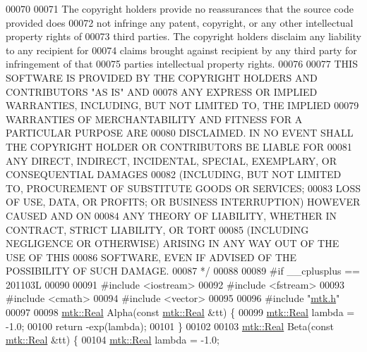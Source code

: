 \begin{DoxyCode}
00070 \textcolor{comment}{}
00071 \textcolor{comment}{The copyright holders provide no reassurances that the source code provided does}
00072 \textcolor{comment}{not infringe any patent, copyright, or any other intellectual property rights of}
00073 \textcolor{comment}{third parties. The copyright holders disclaim any liability to any recipient for}
00074 \textcolor{comment}{claims brought against recipient by any third party for infringement of that}
00075 \textcolor{comment}{parties intellectual property rights.}
00076 \textcolor{comment}{}
00077 \textcolor{comment}{THIS SOFTWARE IS PROVIDED BY THE COPYRIGHT HOLDERS AND CONTRIBUTORS "AS IS" AND}
00078 \textcolor{comment}{ANY EXPRESS OR IMPLIED WARRANTIES, INCLUDING, BUT NOT LIMITED TO, THE IMPLIED}
00079 \textcolor{comment}{WARRANTIES OF MERCHANTABILITY AND FITNESS FOR A PARTICULAR PURPOSE ARE}
00080 \textcolor{comment}{DISCLAIMED. IN NO EVENT SHALL THE COPYRIGHT HOLDER OR CONTRIBUTORS BE LIABLE FOR}
00081 \textcolor{comment}{ANY DIRECT, INDIRECT, INCIDENTAL, SPECIAL, EXEMPLARY, OR CONSEQUENTIAL DAMAGES}
00082 \textcolor{comment}{(INCLUDING, BUT NOT LIMITED TO, PROCUREMENT OF SUBSTITUTE GOODS OR SERVICES;}
00083 \textcolor{comment}{LOSS OF USE, DATA, OR PROFITS; OR BUSINESS INTERRUPTION) HOWEVER CAUSED AND ON}
00084 \textcolor{comment}{ANY THEORY OF LIABILITY, WHETHER IN CONTRACT, STRICT LIABILITY, OR TORT}
00085 \textcolor{comment}{(INCLUDING NEGLIGENCE OR OTHERWISE) ARISING IN ANY WAY OUT OF THE USE OF THIS}
00086 \textcolor{comment}{SOFTWARE, EVEN IF ADVISED OF THE POSSIBILITY OF SUCH DAMAGE.}
00087 \textcolor{comment}{*/}
00088 
00089 \textcolor{preprocessor}{#if \_\_cplusplus == 201103L}
00090 
00091 \textcolor{preprocessor}{#include <iostream>}
00092 \textcolor{preprocessor}{#include <fstream>}
00093 \textcolor{preprocessor}{#include <cmath>}
00094 \textcolor{preprocessor}{#include <vector>}
00095 
00096 \textcolor{preprocessor}{#include "\hyperlink{mtk_8h}{mtk.h}"}
00097 
00098 \hyperlink{group__c01-roots_gac080bbbf5cbb5502c9f00405f894857d}{mtk::Real} Alpha(\textcolor{keyword}{const} \hyperlink{group__c01-roots_gac080bbbf5cbb5502c9f00405f894857d}{mtk::Real} &tt) \{
00099   \hyperlink{group__c01-roots_gac080bbbf5cbb5502c9f00405f894857d}{mtk::Real} lambda = -1.0;
00100   \textcolor{keywordflow}{return} -exp(lambda);
00101 \}
00102 
00103 \hyperlink{group__c01-roots_gac080bbbf5cbb5502c9f00405f894857d}{mtk::Real} Beta(\textcolor{keyword}{const} \hyperlink{group__c01-roots_gac080bbbf5cbb5502c9f00405f894857d}{mtk::Real} &tt) \{
00104   \hyperlink{group__c01-roots_gac080bbbf5cbb5502c9f00405f894857d}{mtk::Real} lambda = -1.0;

\end{DoxyCode}
